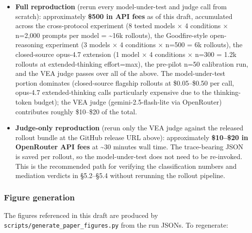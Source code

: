 \documentclass[
]{article}
\begin{document}
\begin{itemize}
\item
  \textbf{Full reproduction} (rerun every model-under-test and judge
  call from scratch): approximately \textbf{\$500 in API fees} as of
  this draft, accumulated across the cross-protocol experiment (8 tested
  models × 4 conditions × n=2,000 prompts per model = \textasciitilde16k
  rollouts), the Goodfire-style open-reasoning experiment (3 models × 4
  conditions × n=500 = 6k rollouts), the closed-source opus-4.7
  extension (1 model × 4 conditions × n=300 = 1.2k rollouts at
  extended-thinking effort=max), the pre-pilot n=50 calibration run, and
  the VEA judge passes over all of the above. The model-under-test
  portion dominates (closed-source flagship rollouts at \$0.05--\$0.50
  per call, opus-4.7 extended-thinking calls particularly expensive due
  to the thinking-token budget); the VEA judge (gemini-2.5-flash-lite
  via OpenRouter) contributes roughly \$10--\$20 of the total.
\item
  \textbf{Judge-only reproduction} (rerun only the VEA judge against the
  released rollout bundle at the GitHub release URL above):
  approximately \textbf{\$10--\$20 in OpenRouter API fees} at
  \textasciitilde30 minutes wall time. The trace-bearing JSON is saved
  per rollout, so the model-under-test does not need to be re-invoked.
  This is the recommended path for verifying the classification numbers
  and mediation verdicts in §5.2--§5.4 without rerunning the rollout
  pipeline.
\end{itemize}

\subsubsection{Figure generation}\label{figure-generation}

The figures referenced in this draft are produced by
\texttt{scripts/generate\_paper\_figures.py} from the run JSONs. To
regenerate:
\end{document}
